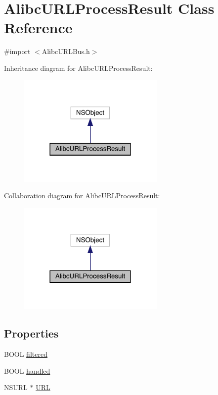 \hypertarget{interface_alibc_u_r_l_process_result}{}\section{Alibc\+U\+R\+L\+Process\+Result Class Reference}
\label{interface_alibc_u_r_l_process_result}


{\ttfamily \#import $<$Alibc\+U\+R\+L\+Bus.\+h$>$}



Inheritance diagram for Alibc\+U\+R\+L\+Process\+Result\+:\nopagebreak
\begin{figure}[H]
\begin{center}
\leavevmode
\includegraphics[width=202pt]{interface_alibc_u_r_l_process_result__inherit__graph}
\end{center}
\end{figure}


Collaboration diagram for Alibc\+U\+R\+L\+Process\+Result\+:\nopagebreak
\begin{figure}[H]
\begin{center}
\leavevmode
\includegraphics[width=202pt]{interface_alibc_u_r_l_process_result__coll__graph}
\end{center}
\end{figure}
\subsection*{Properties}
\begin{DoxyCompactItemize}
\item 
B\+O\+OL \mbox{\hyperlink{interface_alibc_u_r_l_process_result_a3e04725e7a8892a4738c98a70286afb5}{filtered}}
\item 
B\+O\+OL \mbox{\hyperlink{interface_alibc_u_r_l_process_result_a7fe1d9c7dbe221df4408454bd8e98d1b}{handled}}
\item 
N\+S\+U\+RL $\ast$ \mbox{\hyperlink{interface_alibc_u_r_l_process_result_a4d8c755e124e49571bc92537eabe72ed}{U\+RL}}
\end{DoxyCompactItemize}


